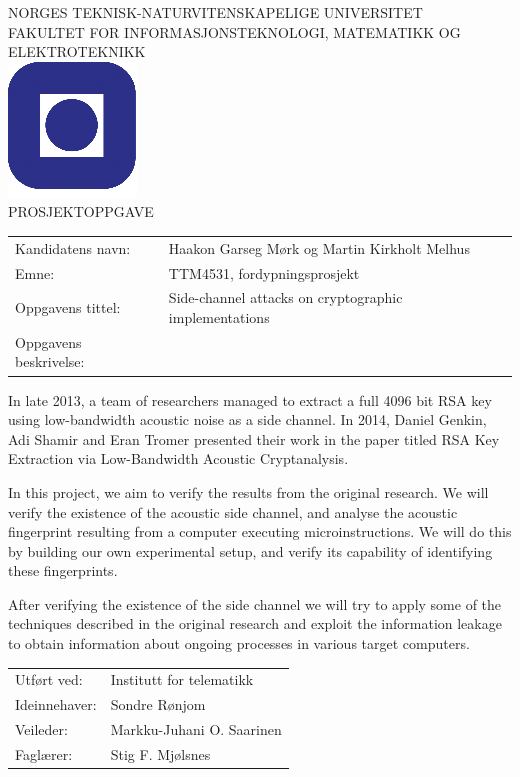 \documentclass[a4paper,11pt]{article}
\begin{document}
\sffamily
\begin{titlepage}
\begin{center}
\textsc{NORGES TEKNISK-NATURVITENSKAPELIGE UNIVERSITET\\
FAKULTET FOR INFORMASJONSTEKNOLOGI, MATEMATIKK OG ELEKTROTEKNIKK} \\
\vspace{0.5cm} 
\includegraphics[scale=0.5]{NTNU-logo} \\
\vspace{1.0cm}
{\Huge{PROSJEKTOPPGAVE}}
\vspace{1.0cm}
\end{center}

\begin{tabular}{@{}p{5cm}l}
Kandidatens navn:	& Haakon Garseg Mørk og Martin Kirkholt Melhus\\
Emne:			& TTM4531, fordypningsprosjekt\\
Oppgavens tittel: 	& Side-channel attacks on cryptographic implementations \\
Oppgavens beskrivelse: 	& \\
\end{tabular}

In late 2013, a team of researchers managed to extract a full 4096 bit RSA key using low-bandwidth
acoustic noise as a side channel. In 2014, Daniel Genkin, Adi Shamir and Eran Tromer presented
their work in the paper titled RSA Key Extraction via Low-Bandwidth Acoustic Cryptanalysis.

In this project, we aim to verify the results from the original research. We will verify the existence of
the acoustic side channel, and analyse the acoustic fingerprint resulting from a computer executing
microinstructions. We will do this by building our own experimental setup, and verify its capability of
identifying these fingerprints.

After verifying the existence of the side channel we will try to apply some of the techniques described in the original research and exploit the information leakage to obtain information about ongoing processes in various target computers.

\begin{tabular}{@{}p{5cm}l}
Utf\o{}rt ved:	& Institutt for telematikk \\
Ideinnehaver:	& Sondre Rønjom \\
Veileder:	& Markku-Juhani O. Saarinen \\
Fagl\ae{}rer: 	& Stig F. Mjølsnes \\
\end{tabular}

\end{titlepage}
\end{document}
